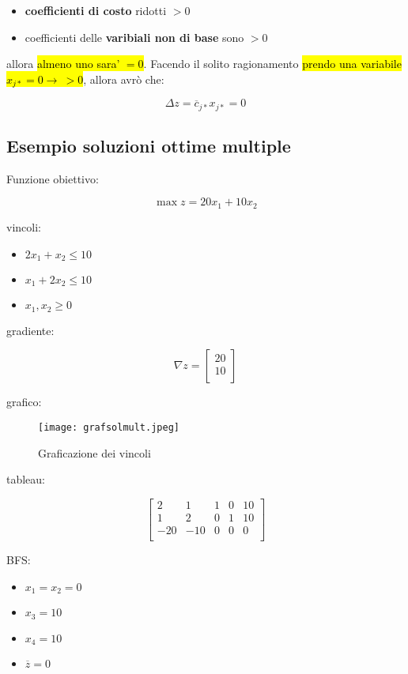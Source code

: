 \begin{itemize}
	\item \textbf{coefficienti di costo} ridotti $> 0$
	\item coefficienti delle \textbf{varibiali non di base} sono $> 0$
\end{itemize}

allora \hl{almeno uno sara' $= 0$}. Facendo il solito ragionamento \hl{prendo una variabile $x_{j*} = 0 \to\ > 0$}, allora avrò che:

$$\Delta z = \overline{c}_{j*} x_{j*} = 0$$


\subsection{Esempio soluzioni ottime multiple}

Funzione obiettivo:

$$\max z = 20x_1 + 10x_2$$

vincoli:

\begin{itemize}
	\item $2x_1 + x_2 \leq 10$
	\item $x_1 + 2x_2 \leq 10$
	\item $x_1, x_2 \geq 0$
\end{itemize}

gradiente:

$$\nabla z =
\left[ {\begin{array}{c}
	20 \\
	10 \\
\end{array} } \right]
$$

grafico:

\begin{figure}[H]
\centering
\texttt{[image: grafsolmult.jpeg]}
\caption{Graficazione dei vincoli} 
\label{grafsolmult}
\end{figure}

tableau:

$$
\left[ {\begin{array}{ccccc}
	2 & 1 & 1 & 0 & 10\\
	1 & 2 & 0 & 1 & 10\\
	-20 & -10 & 0 & 0 & 0\\
\end{array} } \right]
$$

BFS:

\begin{itemize}
	\item $x_1 = x_2 = 0$
	\item $x_3 = 10$
	\item $x_4 = 10$
	\item $\overline{z} = 0$
\end{itemize}

